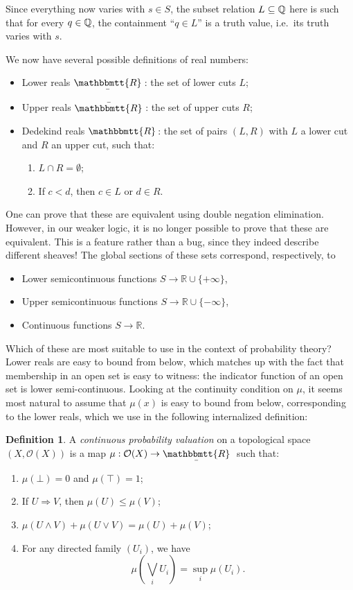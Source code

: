 \documentclass[11pt, oneside, article]{memoir}
\theoremstyle{plain}
\theoremstyle{definition}
\newtheorem{definition}[theorem]{Definition}
\theoremstyle{remark}
\newcommand{\Open}[1]{\mathcal{O}(#1)}
\newcommand{\R}{\mathbb{R}}
\newcommand{\ubar}[1]{\underaccent{\bar}{#1}}
\newcommand{\internal}[1]{\raisebox{-.03ex}{$\mathbbmtt{#1}$}}
\newcommand{\hs}{\hspace{1.1pt}}
\newcommand{\tRR}{\internal{R}\hs}
\newcommand{\tLR}{\ubar{\tRR}\hs}
\newcommand{\tUR}{\bar{\tRR}\hs}
\begin{document}
Since everything now varies with $s\in S$, the subset relation $L \subseteq \mathbb{Q}$ here is such that for every $q\in\mathbb{Q}$, the containment ``$q\in L$'' is a truth value, i.e.~its truth varies with $s$.

We now have several possible definitions of real numbers:

\begin{itemize}
\item Lower reals $\tLR$: the set of lower cuts $L$;
\item Upper reals $\tUR$: the set of upper cuts $R$;
\item Dedekind reals $\tRR$: the set of pairs $(L,R)$ with $L$ a lower cut and $R$ an upper cut, such that:
\begin{enumerate}
\item $L \cap R = \emptyset$;
\item If $c < d$, then $c\in L$ or $d\in R$.
\end{enumerate}
\end{itemize}

One can prove that these are equivalent using double negation elimination. However, in our weaker logic, it is no longer possible to prove that these are equivalent. This is a feature rather than a bug, since they indeed describe different sheaves! The global sections of these sets correspond, respectively, to

\begin{itemize}
\item Lower semicontinuous functions $S \to \R \cup \{+\infty\}$,
\item Upper semicontinuous functions $S \to \R \cup \{-\infty\}$,
\item Continuous functions $S \to \R$.
\end{itemize}

Which of these are most suitable to use in the context of probability theory? Lower reals are easy to bound from below, which matches up with the fact that membership in an open set is easy to witness: the indicator function of an open set is lower semi-continuous. Looking at the continuity condition on $\mu$, it seems most natural to assume that $\mu(x)$ is easy to bound from below, corresponding to the lower reals, which we use in the following internalized definition:

\begin{definition}
	A \emph{continuous probability valuation} on a topological space $(X,\Open{X})$ is a map $\mu : \Open{X} \to \tLR$ such that:
\begin{enumerate}
\item $\mu(\bot) = 0$ and $\mu(\top) = 1$;
\item If $U\Rightarrow V$, then $\mu(U) \leq \mu(V)$;
\item $\mu(U \land V) + \mu(U \lor V) = \mu(U) + \mu(V)$;
\item For any directed family $(U_i)$, we have
\[
	\mu\left( \bigvee_i U_i \right) = \sup_i \mu(U_i).
\]
\end{enumerate}
\end{definition}
\end{document}
